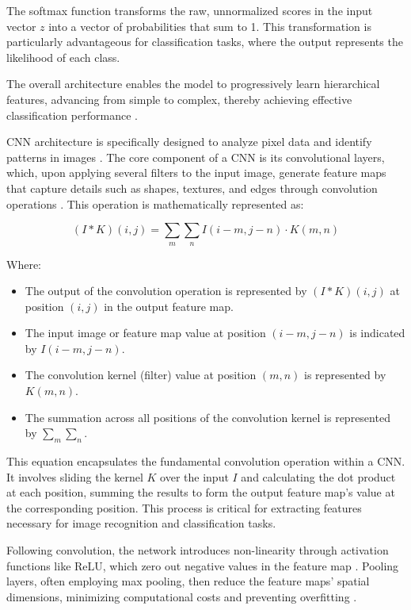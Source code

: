 \documentclass[journal,article,submit,pdftex,moreauthors]{Definitions/mdpi}
\begin{document}
The softmax function transforms the raw, unnormalized scores in the input vector \(z\) into a vector of probabilities that sum to 1. This transformation is particularly advantageous for classification tasks, where the output represents the likelihood of each class.

The overall architecture enables the model to progressively learn hierarchical features, advancing from simple to complex, thereby achieving effective classification performance \cite{he2015convolutional}.

CNN architecture is specifically designed to analyze pixel data and identify patterns in images \cite{zeiler2013stochastic}. The core component of a CNN is its convolutional layers, which, upon applying several filters to the input image, generate feature maps that capture details such as shapes, textures, and edges through convolution operations \cite{huang2017densely}. This operation is mathematically represented as:

\begin{equation}
    (I * K)(i, j) = \sum_m \sum_n I(i-m, j-n) \cdot K(m, n)
\end{equation}

Where:

\begin{itemize}
  \item The output of the convolution operation is represented by  \((I * K)(i, j)\) at position \((i, j)\) in the output feature map.
  \item The input image or feature map value at position \((i-m, j-n)\) is indicated by \(I(i-m, j-n)\).
  \item The convolution kernel (filter) value at position \((m, n)\) is represented by \(K(m, n)\).
  \item The summation across all positions of the convolution kernel is represented by \(\sum_m \sum_n\).

\end{itemize}

This equation encapsulates the fundamental convolution operation within a CNN. It involves sliding the kernel \(K\) over the input \(I\) and calculating the dot product at each position, summing the results to form the output feature map's value at the corresponding position. This process is critical for extracting features necessary for image recognition and classification tasks.

Following convolution, the network introduces non-linearity through activation functions like ReLU, which zero out negative values in the feature map \cite{glorot2011deep}. Pooling layers, often employing max pooling, then reduce the feature maps' spatial dimensions, minimizing computational costs and preventing overfitting \cite{long2015fully}.
\end{document}

